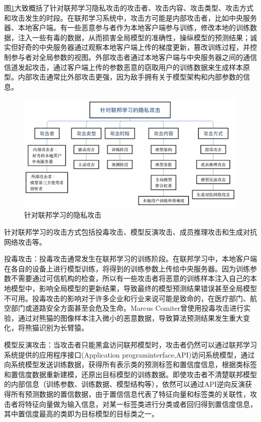 图\ref{fig:联邦学习中的隐私威胁}大致概括了针对联邦学习隐私攻击的攻击者、攻击内容、攻击类型、攻击方式和攻击发生的时段。在联邦学习系统中，攻击方可能是内部攻击者，比如中央服务器、本地客户端。有一些恶意参与者作为本地客户端参与训练，修改本地的训练数据，注入一些有毒的数据，从而损害全局模型的准确性，操纵模型的预测结果；诚实但好奇的中央服务器通过观察本地客户端上传的梯度更新，篡改训练过程，并控制参与者对全局参数的视图。外部攻击者通过本地客户端与中央服务器之间的通信信道发起攻击，通过客户端上传的参数恶意的窃取用户的训练数据来生成样本原型。内部攻击通常比外部攻击更强，因为敌手拥有关于模型架构和内部参数的信息。

\begin{figure}[!hbt]
\centering
	\includegraphics[scale=0.38]{fig2/C1/联邦学习中的隐私威胁}%
	\caption{针对联邦学习的隐私攻击}
	\label{fig:联邦学习中的隐私威胁}	
\end{figure}

针对联邦学习的攻击方式包括投毒攻击、模型反演攻击、成员推理攻击和生成对抗网络攻击等。

投毒攻击：投毒攻击通常发生在联邦学习的训练阶段。在联邦学习中，本地客户端在各自的设备上进行模型训练，将得到的训练参数上传给中央服务器。因为训练参数不需要通过可信机构的检查，所以有一些攻击者将恶意的训练样本注入自己的本地模型中，影响全局模型的更新结果，导致最终的模型预测结果错误甚至全局模型不可用。投毒攻击的影响对于许多企业和行业来说可能是致命的，在医疗部门、航空部门或道路安全方面甚至会危及生命。Marcus Comiter曾使用投毒攻击进行实验，通过对熊猫的图像样本注入微小的恶意数据，导致算法预测结果发生重大变化，将熊猫识别为长臂猿。

模型反演攻击：当攻击者只能黑盒访问联邦模型时，攻击者仍然可以通过联邦学习系统提供的应用程序接口(Application programinterface,API)访问系统模型，通过向系统模型发送训练数据，获得所有表示类的预测标签和置信度信息，根据类标签和置信度数据重新建模，还原出目标模型的训练数据。即使攻击者不清楚联邦模型的内部信息（训练参数、训练数据、模型结构等），依然可以通过API逆向反演获得所有预测数据的置信数据，由于置信信息代表了特征向量和标签类的关联性，攻击者将特征向量做为输入信息，对某一标签类进行分类或者回归得到置信度信息，其中置信度最高的类即为目标模型的目标类之一。

